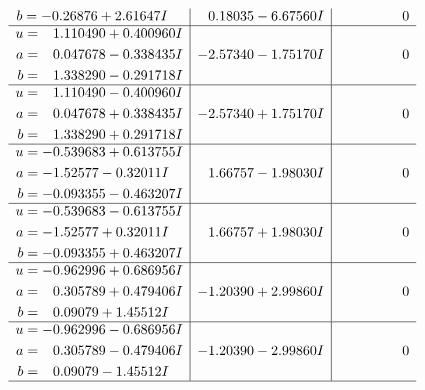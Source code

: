\documentclass[1p]{elsarticle_modified}
\theoremstyle{definition}
\begin{document}
$$\begin{array}{c|c|c}
\begin{aligned}
b &= -0.26876 + 2.61647 I\end{aligned}
 & \phantom{-}0.18035 - 6.67560 I & \phantom{-0.000000 } 0 \\ \hline\begin{aligned}
u &= \phantom{-}1.110490 + 0.400960 I \\
a &= \phantom{-}0.047678 - 0.338435 I \\
b &= \phantom{-}1.338290 - 0.291718 I\end{aligned}
 & -2.57340 - 1.75170 I & \phantom{-0.000000 } 0 \\ \hline\begin{aligned}
u &= \phantom{-}1.110490 - 0.400960 I \\
a &= \phantom{-}0.047678 + 0.338435 I \\
b &= \phantom{-}1.338290 + 0.291718 I\end{aligned}
 & -2.57340 + 1.75170 I & \phantom{-0.000000 } 0 \\ \hline\begin{aligned}
u &= -0.539683 + 0.613755 I \\
a &= -1.52577 - 0.32011 I \\
b &= -0.093355 - 0.463207 I\end{aligned}
 & \phantom{-}1.66757 - 1.98030 I & \phantom{-0.000000 } 0 \\ \hline\begin{aligned}
u &= -0.539683 - 0.613755 I \\
a &= -1.52577 + 0.32011 I \\
b &= -0.093355 + 0.463207 I\end{aligned}
 & \phantom{-}1.66757 + 1.98030 I & \phantom{-0.000000 } 0 \\ \hline\begin{aligned}
u &= -0.962996 + 0.686956 I \\
a &= \phantom{-}0.305789 + 0.479406 I \\
b &= \phantom{-}0.09079 + 1.45512 I\end{aligned}
 & -1.20390 + 2.99860 I & \phantom{-0.000000 } 0 \\ \hline\begin{aligned}
u &= -0.962996 - 0.686956 I \\
a &= \phantom{-}0.305789 - 0.479406 I \\
b &= \phantom{-}0.09079 - 1.45512 I\end{aligned}
 & -1.20390 - 2.99860 I & \phantom{-0.000000 } 0\\
 \hline 
 \end{array}$$\newpage$$\begin{array}{c|c|c}  

\end{array}$$
\end{document}
